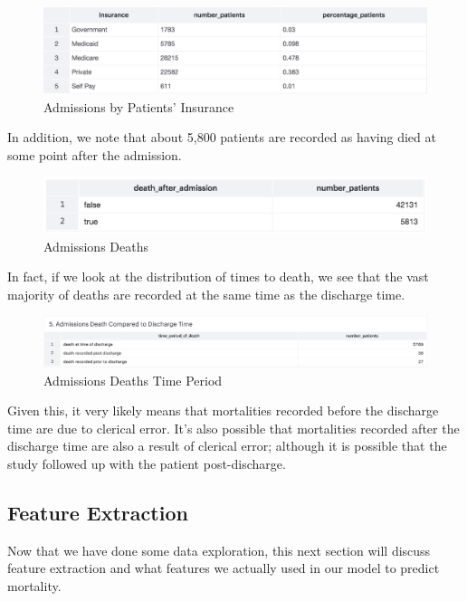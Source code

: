 \documentclass[12pt, final]{article}
\begin{document}
\begin{figure}[H]
\centering
\caption{Admissions by Patients' Insurance}
\label{AdmissionsByInsurance}
\includegraphics[page = {1}, scale = 0.4]{./images/admissions-insurance-summary.png}
\end{figure}

In addition, we note that about 5,800 patients are recorded as having died at some point after the admission.

\begin{figure}[H]
\centering
\caption{Admissions Deaths}
\label{AdmissionsDeaths}
\includegraphics[page = {1}, scale = 0.4]{./images/admissions-deaths.png}
\end{figure}

In fact, if we look at the distribution of times to death, we see that the vast majority of deaths are recorded at the same time as the discharge time.

\begin{figure}[H]
\centering
\caption{Admissions Deaths Time Period}
\label{AdmissionsDeathsTimePeriod}
\includegraphics[page = {1}, scale = 0.4]{./images/admissions-deaths-time-period.png}
\end{figure}

Given this, it very likely means that mortalities recorded before the discharge time are due to clerical error. It's also possible that mortalities recorded after the discharge time are also a result of clerical error; although it is possible that the study followed up with the patient post-discharge.

\subsection{Feature Extraction}
Now that we have done some data exploration, this next section will discuss feature extraction and what features we actually used in our model to predict mortality.
\end{document}
